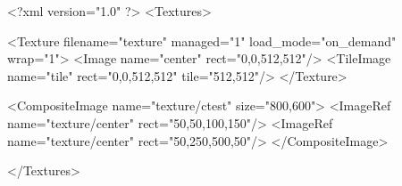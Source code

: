 <?xml version="1.0" ?>
<Textures>

	<Texture filename="texture" managed="1" load_mode="on_demand" wrap="1">
		<Image name="center" rect="0,0,512,512"/>
		<TileImage name="tile" rect="0,0,512,512" tile="512,512"/>
	</Texture>
	
	<CompositeImage name="texture/ctest" size="800,600">
		<ImageRef name="texture/center" rect="50,50,100,150"/>
		<ImageRef name="texture/center" rect="50,250,500,50"/>
	</CompositeImage>

</Textures>
